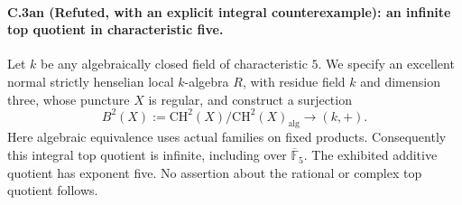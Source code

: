 \paragraph{C.3an (Refuted, with an explicit integral counterexample): an infinite top quotient in characteristic five.}
Let $k$ be any algebraically closed field of characteristic $5$.
We specify an excellent normal strictly henselian local $k$-algebra
$R$, with residue field $k$ and dimension three, whose puncture $X$
is regular, and construct a surjection
\[
 B^2(X):=\mathrm{CH}^2(X)/\mathrm{CH}^2(X)_{\mathrm{alg}}
                          \longrightarrow(k,+).
\]
Here algebraic equivalence uses actual families on fixed products.
Consequently this integral top quotient is infinite, including over
$\overline{\mathbb F}_5$. The exhibited additive quotient has exponent
five. No assertion about the rational or complex top quotient follows.

